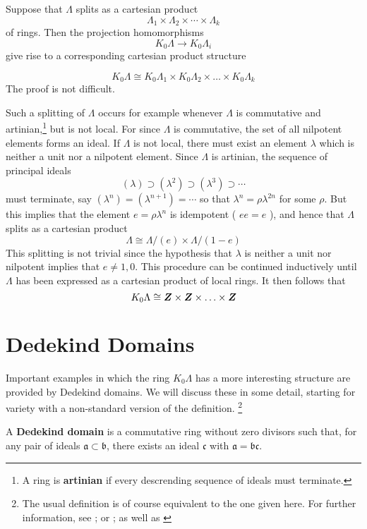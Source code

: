 \begin{exmp}
	Suppose that $\Lambda$ splits as a cartesian product
	\[
		\Lambda_{1} \times \Lambda_{2} \times \cdots \times \Lambda_{k}
	\]
	of rings. Then the projection homomorphisms
	\[
		K_{0} \Lambda \to K_{0} \Lambda_{i}
	\]
	give rise to a corresponding cartesian product structure

	\[
		K_{0} \Lambda \cong K_{0} \Lambda_{1} \times K_{0} \Lambda_{2} \times \ldots \times K_{0} \Lambda_{k}
	\]
	The proof is not difficult.

	Such a splitting of $\Lambda$ occurs for example whenever $\Lambda$ is commutative and artinian,\footnote{A ring is \textbf{artinian} if every descrending sequence of ideals must terminate.} but is not local. For since $\Lambda$ is commutative, the set of all nilpotent elements forms an ideal. If $\Lambda$ is not local, there must exist an element $\lambda$ which is neither a unit nor a nilpotent element. Since $\Lambda$ is artinian, the sequence of principal ideals
	\[
		(\lambda) \supset\left(\lambda^{2}\right) \supset\left(\lambda^{3}\right) \supset \cdots
	\]
	must terminate, say $\left(\lambda^{n}\right)=\left(\lambda^{n+1}\right)=\cdots$ so that $\lambda^{n}=\rho \lambda^{2 n}$ for some $\rho$. But this implies that the element $e=\rho \lambda^{n}$ is idempotent ( $ee=e$ ), and hence that $\Lambda$ splits as a cartesian product
	\[
		\Lambda \cong \Lambda /(e) \times \Lambda /(1-e)
	\]
	This splitting is not trivial since the hypothesis that $\lambda$ is neither a unit nor nilpotent implies that $e \neq 1,0$. This procedure can be continued inductively until $\Lambda$ has been expressed as a cartesian product of local rings. It then follows that
	\[
	K_{0} \Lambda \cong \bm{Z} \times \bm{Z} \times \ldots \times \bm{Z}
	\]
\end{exmp}

\section{Dedekind Domains}

Important examples in which the ring $K_{0} \Lambda$ has a more interesting structure are provided by Dedekind domains. We will discuss these in some detail, starting for variety with a non-standard version of the definition.
\footnote{The usual definition is of course equivalent to the one given here. For further information, see \cite{Zariski}; or \cite{Lang}; as well as \cite{Cartan1999Dec}}

\begin{defn}
	A \textbf{Dedekind domain} is a commutative ring without zero divisors such that, for any pair of ideals $\mathfrak{a} \subset \mathfrak{b}$, there exists an ideal $\mathfrak{c}$ with $\mathfrak{a}=\mathfrak{b} \mathfrak{c}$.
\end{defn}

